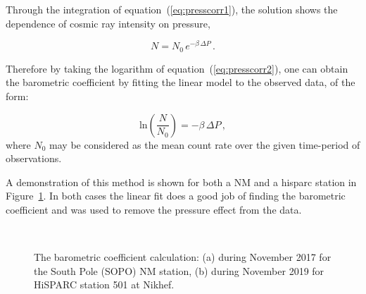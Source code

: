 Through the integration of equation~(\ref{eq:presscorr1}), the solution shows the dependence of cosmic ray intensity on pressure,

\begin{equation}
N = N_{0} \, e^{-\beta \, \Delta P} \, .
\label{eq:presscorr2}
\end{equation}

Therefore by taking the logarithm of equation~(\ref{eq:presscorr2}), one can obtain the barometric coefficient by fitting the linear model to the observed data, of the form:

\begin{equation}
\mathrm{ln} \left( \frac{N}{N_0} \right) = - \beta \, \Delta P \, ,
\label{eq:presscorr3}
\end{equation}
%
where $N_0$ may be considered as the mean count rate over the given time-period of observations.

A demonstration of this method is shown for both a NM and a \gls{hisparc} station in Figure~\ref{fig:barometric_fit}. In both cases the linear fit does a good job of finding the barometric coefficient and was used to remove the pressure effect from the data.

\begin{figure}[ht!]
	\centering
	 \\
	
	\caption{The barometric coefficient calculation: (a) during November 2017 for the South Pole (SOPO) NM station, (b) during November 2019 for HiSPARC station 501 at Nikhef.}
	\label{fig:barometric_fit}
\end{figure}

